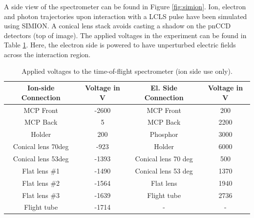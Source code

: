 A side view of the spectrometer can be found in Figure \ref{fig:simion}. Ion, electron and photon trajectories upon interaction with a LCLS pulse have been simulated using SIMION. A conical lens stack avoids casting a shadow on the pnCCD detectors (top of image). The applied voltages in the experiment can be found in Table \ref{tab:tof-volategs}. Here, the electron side is powered to have unperturbed electric fields across the interaction region.
\begin{table}
\centering
\begin{tabular}{ | c | c || c | c | }
\hline
	\textbf{Ion-side Connection} & \textbf{Voltage in V} & \textbf{El. Side Connection} & \textbf{Voltage in V} \\ \hline
	MCP Front & -2600 & MCP Front & 200 \\ \hline
	MCP Back & 5 & MCP Back & 2200 \\ \hline
	Holder & 200 & Phosphor & 3000 \\ \hline
	Conical lens 70deg & -923 & Holder & 6000 \\ \hline
	Conical lens 53deg & -1393 & Conical lens 70 deg & 500 \\ \hline
	Flat lens \#1 & -1490 & Conical lens 53 deg & 1370 \\ \hline
	Flat lens \#2 & -1564 & Flat lens & 1940 \\ \hline
	Flat lens \#3 & -1639 & Flight tube & 2736 \\ \hline
	Flight tube & -1714 & - & - \\ \hline
\end{tabular}
\caption{Applied voltages to the time-of-flight spectrometer (ion side use only).}
\label{tab:tof-volategs}
\end{table}
%
%
%